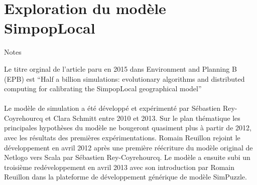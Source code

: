 \printbibliography[heading=subbibliography]




\chapter{Exploration du modèle SimpopLocal}


\begin{framewithtitle}{Notes}

Le titre orginal de l'article paru en 2015 dans Environment and Planning B (EPB) est \foreignquote{english}{Half a billion simulations: evolutionary algorithms and distributed computing for calibrating the SimpopLocal geographical model}
\\ \\
Le modèle de simulation a été développé et expérimenté par Sébastien Rey-Coyrehourcq et Clara Schmitt entre 2010 et 2013. Sur le plan thématique les principales hypothèses du modèle ne bougeront quasiment plus à partir de 2012, avec les résultats des premières expérimentations. Romain Reuillon rejoint le développement en avril 2012 après une première réécriture du modèle original de Netlogo vers Scala par Sébastien Rey-Coyrehourcq. Le modèle a ensuite subi un troisième redéveloppement en avril 2013 avec son introduction par Romain Reuillon dans la plateforme de développement générique de modèle SimPuzzle.

\end{framewithtitle}







